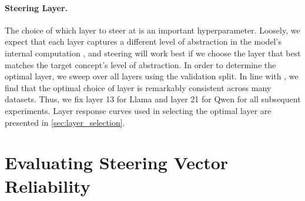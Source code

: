 \documentclass{article}
\begin{document}
\paragraph{Steering Layer.} The choice of which layer to steer at is an important hyperparameter. Loosely, we expect that each layer captures a different level of abstraction in the model's internal computation \citep{elhage2021mathematical}, and steering will work best if we choose the layer that best matches the target concept's level of abstraction. In order to determine the optimal layer, we sweep over all layers using the validation split. In line with \citet{rimskySteeringLlamaContrastive2023}, we find that the optimal choice of layer is remarkably consistent across many datasets. Thus, we fix layer 13 for Llama and layer 21 for Qwen for all subsequent experiments. Layer response curves used in selecting the optimal layer are presented in \cref{sec:layer_selection}. 




\section{Evaluating Steering Vector Reliability}\label{sec:sv_reliability}
\end{document}
